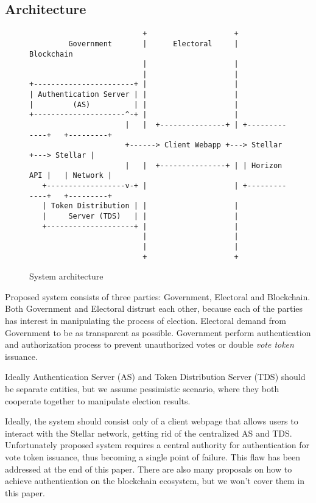 \documentclass[runningheads]{llncs}
\begin{document}
\subsection{Architecture}
\begin{figure}
\begin{verbatim}
                          +                    +
         Government       |      Electoral     |      Blockchain
                          |                    |
                          |                    |
+-----------------------+ |                    |
| Authentication Server | |                    |
|         (AS)          | |                    |
+---------------------^-+ |                    |
                      |   |  +---------------+ | +-------------+   +---------+
                      +------> Client Webapp +---> Stellar     +---> Stellar |
                      |   |  +---------------+ | | Horizon API |   | Network |
   +------------------v-+ |                    | +-------------+   +---------+
   | Token Distribution | |                    |
   |     Server (TDS)   | |                    |
   +--------------------+ |                    |
                          |                    |
                          |                    |
                          +                    +
\end{verbatim}
\caption{System architecture}
\label{fig:ascii-box}
\end{figure} 

Proposed system consists of three parties: Government, Electoral and Blockchain. Both Government and Electoral distrust each other, because each of the parties has interest in manipulating the process of election. Electoral demand from Government to be as transparent as possible. Government perform authentication and authorization process to prevent unauthorized votes or double \textit{vote token} issuance.

Ideally Authentication Server (AS) and Token Distribution Server (TDS) should be separate entities, but we assume pessimistic scenario, where they both cooperate together to manipulate election results.

Ideally, the system should consist only of a client webpage that allows users to interact with the Stellar network, getting rid of the centralized AS and TDS. Unfortunately proposed system requires a central authority for authentication for vote token issuance, thus becoming a single point of failure. This flaw has been addressed at the end of this paper. There are also many proposals on how to achieve authentication on the blockchain ecosystem, but we won't cover them in this paper.
\end{document}
